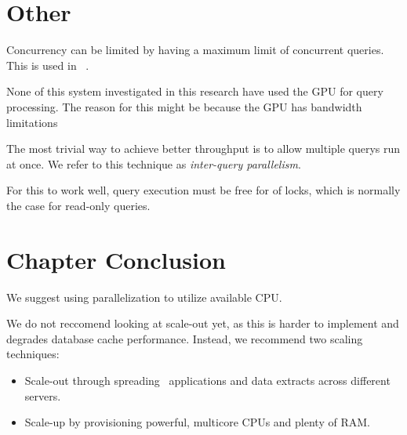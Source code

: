 \section{Other}
\label{sec:Other}
Concurrency can be limited by having a maximum limit of concurrent queries. This is used in \ibm~\cite{Raman2013-em}.

None of this system investigated in this research have used the GPU for query processing. The reason for this might be because the GPU has bandwidth limitations \cite{Willhalm2009-hu} 

The most trivial way to achieve better throughput is to allow multiple querys run at once. We refer to this technique as \textit{inter-query parallelism}.

For this to work well, query execution must be free for of locks, which is normally the case for read-only queries.

\section{Chapter Conclusion}
\label{sec:Chapter Conclusion}
We suggest using parallelization to utilize available CPU. 

We do not reccomend looking at scale-out yet, as this is harder to implement and degrades database cache performance. Instead, we recommend two scaling techniques:
\begin{itemize}
  \item Scale-out through spreading \bd~applications and data extracts across different servers.
  \item Scale-up by provisioning powerful, multicore CPUs and plenty of RAM.
\end{itemize}
